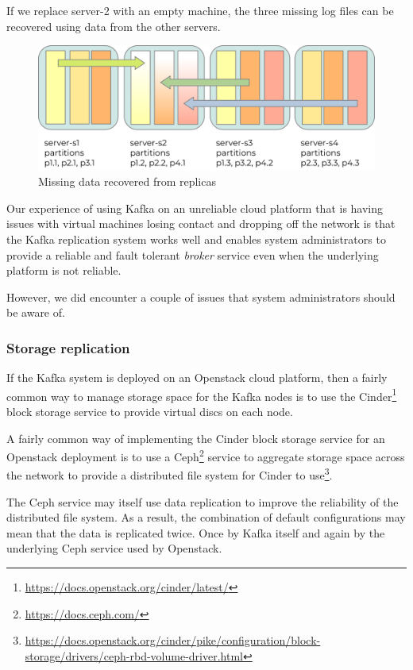 \documentclass{article}
\newcommand{\openstack} {Openstack\xspace}
\newcommand{\ceph} {Ceph\xspace}
\newcommand{\kafka} {Kafka\xspace}
\newcommand{\kfbroker} {\textit{broker}\xspace}
\newcommand{\footurl}[1] {\footnote{\url{#1}}}
\begin{document}
If we replace server-2 with an empty machine, the three missing log files can be recovered using data from the other servers.

\begin{figure}[H]
\centering
\includegraphics{images/kafka-partitions-04.png}
%
\caption{Missing data recovered from replicas}
\label{fig:kafka-partitions-04}
\end{figure}

Our experience of using \kafka on an unreliable cloud platform that is having issues with virtual machines losing contact and dropping off the network is that the \kafka replication system works well and enables system administrators to provide a reliable and fault tolerant \kfbroker service even when the underlying platform is not reliable.

However, we did encounter a couple of issues that system administrators should be aware of.

\subsubsection{Storage replication}
\label{storage-replication}

If the \kafka system is deployed on an \openstack cloud platform, then a fairly common way to manage storage space for the \kafka nodes is to use the Cinder\footurl{https://docs.openstack.org/cinder/latest/} block storage service to provide virtual discs on each node.

A fairly common way of implementing the Cinder block storage service for an \openstack deployment is to use a \ceph\footurl{https://docs.ceph.com/} service to aggregate storage space across the network to provide a distributed file system for Cinder to use\footurl{https://docs.openstack.org/cinder/pike/configuration/block-storage/drivers/ceph-rbd-volume-driver.html}.

The \ceph service may itself use data replication to improve the reliability of the distributed file system.
As a result, the combination of default configurations may mean that the data is replicated twice. Once by \kafka itself and again by the underlying \ceph service used by \openstack.
\end{document}
